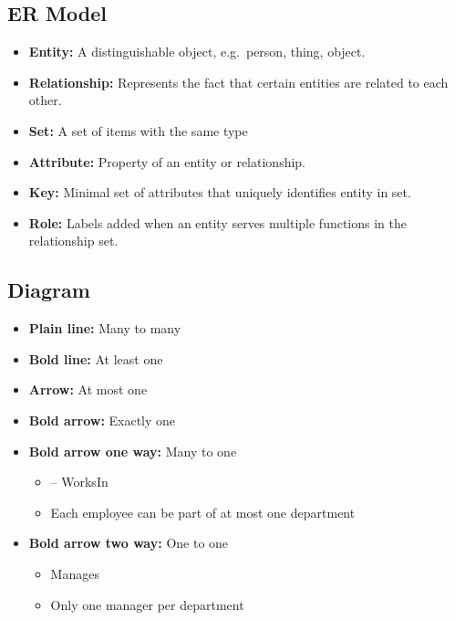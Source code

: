 \documentclass[landscape, letterpaper]{extarticle}
\begin{document}
\begin{multicols}{3}
    \section*{ER Model}
    \begin{itemize}[noitemsep,nolistsep]
        \item \textbf{Entity:} A distinguishable object, e.g.\ person, thing, object.
        \item \textbf{Relationship:} Represents the fact that certain entities are related to each other.
        \item \textbf{Set:} A set of items with the same type
        \item \textbf{Attribute:} Property of an entity or relationship.
        \item \textbf{Key:} Minimal set of attributes that uniquely identifies entity in set.
        \item \textbf{Role:} Labels added when an entity serves multiple functions in the relationship set.
    \end{itemize}
    \subsection*{Diagram}
    \begin{itemize}[noitemsep,nolistsep]
        \item \textbf{Plain line:} Many to many
        \item \textbf{Bold line:} At least one
        \item \textbf{Arrow:} At most one
        \item \textbf{Bold arrow:} Exactly one
        \item \textbf{Bold arrow one way:} Many to one
              \begin{itemize}[noitemsep,nolistsep]
                  \item {} -- WorksIn \bm{\rightarrow} 
                  \item Each employee can be part of at most one department
              \end{itemize}
        \item \textbf{Bold arrow two way:} One to one
              \begin{itemize}[noitemsep,nolistsep]
                  \item {} \bm{\leftarrow} Manages \bm{\rightarrow} 
                  \item Only one manager per department
              \end{itemize}
    \end{itemize}

\end{multicols}
\end{document}
